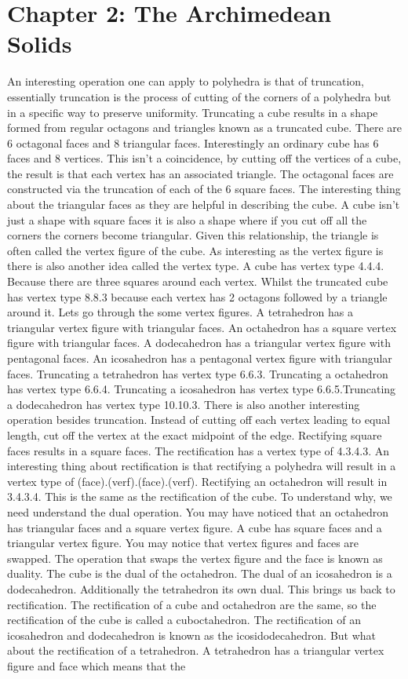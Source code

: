 \documentclass{article}
\begin{document}
\section*{Chapter 2: The Archimedean Solids}
An interesting operation one can apply to polyhedra is that of truncation, essentially truncation is the process of cutting of the corners of a polyhedra but in a specific way to preserve uniformity. Truncating a cube results in a shape formed from regular octagons and triangles known as a truncated cube. There are 6 octagonal faces and 8 triangular faces. Interestingly an ordinary cube has 6 faces and 8 vertices. This isn't a coincidence, by cutting off the vertices of a cube, the result is that each vertex has an associated triangle. The octagonal faces are constructed via the truncation of each of the 6 square faces. The interesting thing about the triangular faces as they are helpful in describing the cube. A cube isn't just a shape with square faces it is also a shape where if you cut off all the corners the corners become triangular. Given this relationship, the triangle is often called the vertex figure of the cube. As interesting as the vertex figure is there is also another idea called the vertex type. A cube has vertex type 4.4.4. Because there are three squares around each vertex. Whilst the truncated cube has vertex type 8.8.3 because each vertex has 2 octagons followed by a triangle around it. Lets go through the some vertex figures. A tetrahedron has a triangular vertex figure with triangular faces. An octahedron has a square vertex figure with triangular faces. A dodecahedron has a triangular vertex figure with pentagonal faces. An icosahedron has a pentagonal vertex figure with triangular faces. Truncating a tetrahedron has vertex type 6.6.3. Truncating a octahedron has vertex type 6.6.4. Truncating a icosahedron has vertex type 6.6.5.Truncating a dodecahedron has vertex type 10.10.3. There is also another interesting operation besides truncation. Instead of cutting off each vertex leading to equal length, cut off the vertex at the exact midpoint of the edge. Rectifying square faces results in a square faces. The rectification has a vertex type of 4.3.4.3. An interesting thing about rectification is that rectifying a polyhedra will result in a vertex type of (face).(verf).(face).(verf). Rectifying an octahedron will result in 3.4.3.4. This is the same as the rectification of the cube. To understand why, we need understand the dual operation. You may have noticed that an octahedron has triangular faces and a square vertex figure. A cube has square faces and a triangular vertex figure. You may notice that vertex figures and faces are swapped. The operation that swaps the vertex figure and the face is known as duality. The cube is the dual of the octahedron. The dual of an icosahedron is a dodecahedron. Additionally the tetrahedron its own dual. This brings us back to rectification. The rectification of a cube and octahedron are the same, so the rectification of the cube is called a cuboctahedron. The rectification of an icosahedron and dodecahedron is known as the icosidodecahedron. But what about the rectification of a tetrahedron. A tetrahedron has a triangular vertex figure and face which means that the 
\end{document}

